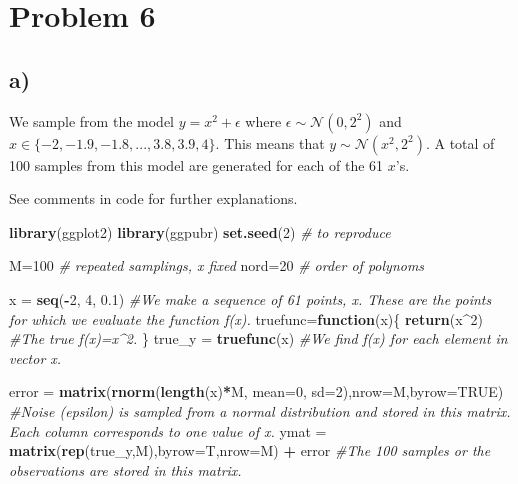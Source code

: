 \documentclass[]{article}
\newenvironment{Shaded}{\begin{snugshade}}{\end{snugshade}}
\newcommand{\KeywordTok}[1]{\textcolor[rgb]{0.13,0.29,0.53}{\textbf{#1}}}
\newcommand{\DataTypeTok}[1]{\textcolor[rgb]{0.13,0.29,0.53}{#1}}
\newcommand{\DecValTok}[1]{\textcolor[rgb]{0.00,0.00,0.81}{#1}}
\newcommand{\FloatTok}[1]{\textcolor[rgb]{0.00,0.00,0.81}{#1}}
\newcommand{\StringTok}[1]{\textcolor[rgb]{0.31,0.60,0.02}{#1}}
\newcommand{\CommentTok}[1]{\textcolor[rgb]{0.56,0.35,0.01}{\textit{#1}}}
\newcommand{\OtherTok}[1]{\textcolor[rgb]{0.56,0.35,0.01}{#1}}
\newcommand{\ControlFlowTok}[1]{\textcolor[rgb]{0.13,0.29,0.53}{\textbf{#1}}}
\newcommand{\OperatorTok}[1]{\textcolor[rgb]{0.81,0.36,0.00}{\textbf{#1}}}
\newcommand{\NormalTok}[1]{#1}
\begin{document}
\section{Problem 6}\label{problem-6}

\subsection{a)}\label{a}

We sample from the model \(y=x^2+\epsilon\) where
\(\epsilon \sim \mathcal{N}(0,2^2)\) and
\(x\in \{-2,-1.9,-1.8,...,3.8,3.9,4\}\). This means that
\(y \sim \mathcal{N}(x^2,2^2)\). A total of 100 samples from this model
are generated for each of the 61 \(x\)'s.

See comments in code for further explanations.

\begin{Shaded}
\begin{Highlighting}[]
\KeywordTok{library}\NormalTok{(ggplot2)}
\KeywordTok{library}\NormalTok{(ggpubr)}
\KeywordTok{set.seed}\NormalTok{(}\DecValTok{2}\NormalTok{) }\CommentTok{# to reproduce}

\NormalTok{M=}\DecValTok{100} \CommentTok{# repeated samplings, x fixed }
\NormalTok{nord=}\DecValTok{20} \CommentTok{# order of polynoms}


\NormalTok{x =}\StringTok{ }\KeywordTok{seq}\NormalTok{(}\OperatorTok{-}\DecValTok{2}\NormalTok{, }\DecValTok{4}\NormalTok{, }\FloatTok{0.1}\NormalTok{) }\CommentTok{#We make a sequence of 61 points, x. These are the points for which we evaluate the function f(x).}
\NormalTok{truefunc=}\ControlFlowTok{function}\NormalTok{(x)\{}
  \KeywordTok{return}\NormalTok{(x}\OperatorTok{^}\DecValTok{2}\NormalTok{) }\CommentTok{#The true f(x)=x^2. }
\NormalTok{\}}
\NormalTok{true_y =}\StringTok{ }\KeywordTok{truefunc}\NormalTok{(x) }\CommentTok{#We find f(x) for each element in vector x.}

\NormalTok{error =}\StringTok{ }\KeywordTok{matrix}\NormalTok{(}\KeywordTok{rnorm}\NormalTok{(}\KeywordTok{length}\NormalTok{(x)}\OperatorTok{*}\NormalTok{M, }\DataTypeTok{mean=}\DecValTok{0}\NormalTok{, }\DataTypeTok{sd=}\DecValTok{2}\NormalTok{),}\DataTypeTok{nrow=}\NormalTok{M,}\DataTypeTok{byrow=}\OtherTok{TRUE}\NormalTok{) }\CommentTok{#Noise (epsilon) is sampled from a normal distribution and stored in this matrix. Each column corresponds to one value of x.}
\NormalTok{ymat =}\StringTok{ }\KeywordTok{matrix}\NormalTok{(}\KeywordTok{rep}\NormalTok{(true_y,M),}\DataTypeTok{byrow=}\NormalTok{T,}\DataTypeTok{nrow=}\NormalTok{M) }\OperatorTok{+}\StringTok{ }\NormalTok{error }\CommentTok{#The 100 samples or the observations are stored in this matrix.}


\end{Highlighting}
\end{Shaded}
\end{document}
